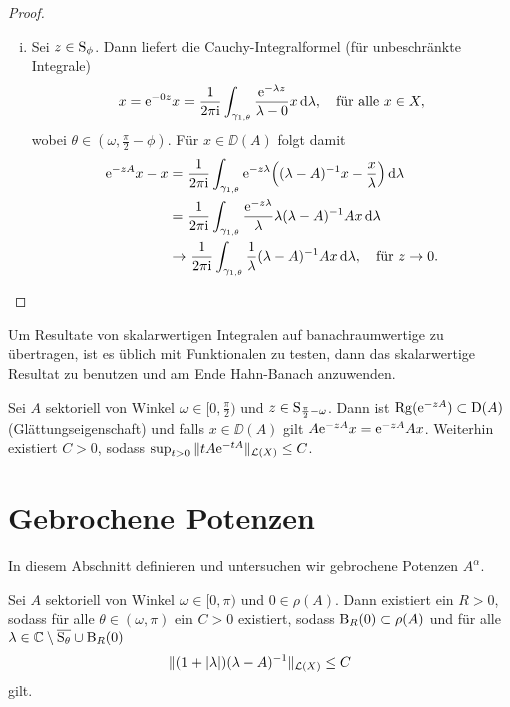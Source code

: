 \begin{proof}
\begin{enumerate}[(i)]
    \item Sei $z \in \mathrm{S}_\phi$. 
      Dann liefert die Cauchy-Integralformel (für unbeschränkte Integrale)
      $$
      x 
      = \mathrm{e}^{-0z} x
      = \frac{1}{2\pi \mathrm{i}} \int_{\gamma_{1,\theta}} \frac{\mathrm{e}^{-\lambda z}}{\lambda - 0} x \, {\operatorname{d}\!{\lambda}}, \quad\text{für alle } x \in X,
      $$
      wobei $\theta \in (\omega, \frac{\pi}{2} - \phi)$.
      Für $x \in \DD(A)$ folgt damit
     \begin{align*}
       \mathrm{e}^{-zA} x - x 
       &= \frac{1}{2\pi \mathrm{i}} \int_{\gamma_{1,\theta}} \mathrm{e}^{-z\lambda} \Big( (\lambda - A)^{-1} x - \frac{x}{\lambda} \Big) \, {\operatorname{d}\!{\lambda}} \\
       &= \frac{1}{2\pi \mathrm{i}} \int_{\gamma_{1,\theta}} \frac{\mathrm{e}^{-z\lambda}}{\lambda}  \lambda (\lambda - A)^{-1} A x \, {\operatorname{d}\!{\lambda}} \\
       &\to \frac{1}{2\pi \mathrm{i}} \int_{\gamma_{1,\theta}} \frac{1}{\lambda} (\lambda - A)^{-1} A x \, {\operatorname{d}\!{\lambda}}, \quad \text{für } z \to 0.
     \end{align*}
  \end{enumerate}
\end{proof}

\begin{rem}
  Um Resultate von skalarwertigen Integralen auf banachraumwertige zu übertragen, ist es üblich mit Funktionalen zu testen, dann das skalarwertige Resultat zu benutzen und am Ende Hahn-Banach anzuwenden.
\end{rem}

\begin{thm}
  Sei $A$ sektoriell von Winkel $\omega \in [0,\frac{\pi}{2})$ und $z \in \mathrm{S}_{\frac{\pi}{2} - \omega}$.
    Dann ist $\operatorname{Rg}(\mathrm{e}^{-zA}) \subset \mathrm{D}(A)$ (Glättungseigenschaft) und falls $x \in \DD(A)$ gilt $A \mathrm{e}^{-zA} x = \mathrm{e}^{-z A} A x$.
    Weiterhin existiert $C > 0$, sodass $\sup_{t > 0} \|t A \mathrm{e}^{-t A} \|_{\mathcal{L}(X)} \leq C$.
\end{thm}

\section{Gebrochene Potenzen}

In diesem Abschnitt definieren und untersuchen wir gebrochene Potenzen $A^\alpha$.

\begin{prop}
  \label{prop:resolventEstImproved}
  Sei $A$ sektoriell von Winkel $\omega \in [0,\pi)$ und $0 \in \rho(A)$.
    Dann existiert ein $R > 0$, sodass für alle $\theta \in (\omega, \pi)$ ein $C > 0$ existiert, sodass $\mathrm{B}_R(0) \subset \rho(A)$ und für alle $\lambda \in \mathbb{C} \setminus \overline{\mathrm{S}_\theta} \cup \mathrm{B}_R(0)$
    $$
    \| (1 + |\lambda| ) (\lambda - A)^{-1} \|_{\mathcal{L}(X)} \leq C
    $$
    gilt.
\end{prop}

